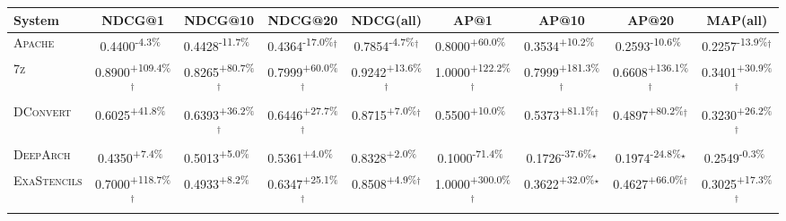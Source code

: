 \begin{table}[htbp]
\centering
\renewcommand{\arraystretch}{1.2}
\begin{tabular}{l|cccc|cccc}
\hline
System & NDCG@1 & NDCG@10 & NDCG@20 & NDCG(all) & AP@1 & AP@10 & AP@20 & MAP(all) \\ \hline
\textsc{Apache} & \cellcolor{red!30}0.4400\textsuperscript{-4.3\%}$^{\,\,\,}$ & \cellcolor{red!30}0.4428\textsuperscript{-11.7\%}$^{\,\,\,}$ & \cellcolor{red!30}0.4364\textsuperscript{-17.0\%}$^\dagger$ & \cellcolor{red!30}0.7854\textsuperscript{-4.7\%}$^\dagger$ & \cellcolor{green!30}0.8000\textsuperscript{+60.0\%}$^{\,\,\,}$ & \cellcolor{green!30}0.3534\textsuperscript{+10.2\%}$^{\,\,\,}$ & \cellcolor{red!30}0.2593\textsuperscript{-10.6\%}$^{\,\,\,}$ & \cellcolor{red!30}0.2257\textsuperscript{-13.9\%}$^\dagger$ \\
\textsc{7z} & \cellcolor{green!30}0.8900\textsuperscript{+109.4\%}$^\dagger$ & \cellcolor{green!30}0.8265\textsuperscript{+80.7\%}$^\dagger$ & \cellcolor{green!30}0.7999\textsuperscript{+60.0\%}$^\dagger$ & \cellcolor{green!30}0.9242\textsuperscript{+13.6\%}$^\dagger$ & \cellcolor{green!30}1.0000\textsuperscript{+122.2\%}$^\dagger$ & \cellcolor{green!30}0.7999\textsuperscript{+181.3\%}$^\dagger$ & \cellcolor{green!30}0.6608\textsuperscript{+136.1\%}$^\dagger$ & \cellcolor{green!30}0.3401\textsuperscript{+30.9\%}$^\dagger$ \\
\textsc{DConvert} & \cellcolor{green!30}0.6025\textsuperscript{+41.8\%}$^{\,\,\,}$ & \cellcolor{green!30}0.6393\textsuperscript{+36.2\%}$^\dagger$ & \cellcolor{green!30}0.6446\textsuperscript{+27.7\%}$^\dagger$ & \cellcolor{green!30}0.8715\textsuperscript{+7.0\%}$^\dagger$ & \cellcolor{green!30}0.5500\textsuperscript{+10.0\%}$^{\,\,\,}$ & \cellcolor{green!30}0.5373\textsuperscript{+81.1\%}$^\dagger$ & \cellcolor{green!30}0.4897\textsuperscript{+80.2\%}$^\dagger$ & \cellcolor{green!30}0.3230\textsuperscript{+26.2\%}$^\dagger$ \\
\textsc{DeepArch} & \cellcolor{green!30}0.4350\textsuperscript{+7.4\%}$^{\,\,\,}$ & \cellcolor{green!30}0.5013\textsuperscript{+5.0\%}$^{\,\,\,}$ & \cellcolor{green!30}0.5361\textsuperscript{+4.0\%}$^{\,\,\,}$ & \cellcolor{green!30}0.8328\textsuperscript{+2.0\%}$^{\,\,\,}$ & \cellcolor{red!30}0.1000\textsuperscript{-71.4\%}$^{\,\,\,}$ & \cellcolor{red!30}0.1726\textsuperscript{-37.6\%}$^\star$ & \cellcolor{red!30}0.1974\textsuperscript{-24.8\%}$^\star$ & \cellcolor{red!30}0.2549\textsuperscript{-0.3\%}$^{\,\,\,}$ \\
\textsc{ExaStencils} & \cellcolor{green!30}0.7000\textsuperscript{+118.7\%}$^\dagger$ & \cellcolor{green!30}0.4933\textsuperscript{+8.2\%}$^{\,\,\,}$ & \cellcolor{green!30}0.6347\textsuperscript{+25.1\%}$^\dagger$ & \cellcolor{green!30}0.8508\textsuperscript{+4.9\%}$^\dagger$ & \cellcolor{green!30}1.0000\textsuperscript{+300.0\%}$^\dagger$ & \cellcolor{green!30}0.3622\textsuperscript{+32.0\%}$^\star$ & \cellcolor{green!30}0.4627\textsuperscript{+66.0\%}$^\dagger$ & \cellcolor{green!30}0.3025\textsuperscript{+17.3\%}$^\dagger$ \\

\end{tabular}
\end{table}
